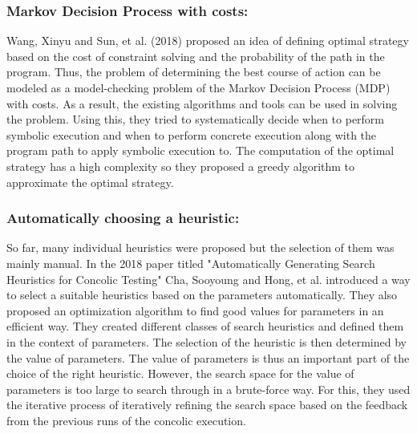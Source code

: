\documentclass[ runningheads,
               a4paper]{llncs}
\begin{document}
\subsubsection{Markov Decision Process with costs:}
Wang, Xinyu and Sun, et al. (2018) proposed an idea \cite{wang2018towards}  of defining optimal strategy based on the cost of constraint solving and the probability of the path in the program. Thus, the problem of determining the best course of action can be modeled as a model-checking problem of the Markov Decision Process (MDP) with costs. As a result, the existing algorithms and tools can be used in solving the problem. Using this, they tried to  systematically decide when to perform symbolic execution and when to perform concrete execution along with the program path to apply symbolic execution to.
The computation of the optimal strategy has a high complexity so they proposed a greedy algorithm to approximate the optimal strategy.


\subsubsection{Automatically choosing a heuristic:}
So far, many individual heuristics were proposed but the selection of them was mainly manual. In the 2018 paper titled "Automatically Generating Search Heuristics for Concolic Testing" \cite{cha2018automatically} Cha, Sooyoung and Hong, et al. introduced a way to select a suitable heuristics based on the parameters automatically. They also proposed an optimization algorithm to find good values for parameters in an efficient way. They created different classes of search heuristics and defined them in the context of parameters. The selection of the heuristic is then determined by the value of parameters. The value of parameters is thus an important part of the choice of the right heuristic. However, the search space for the value of parameters is too large to search through in a brute-force way. For this, they used the iterative process of iteratively refining the search space based on the feedback from the previous runs of the concolic execution.
\end{document}
